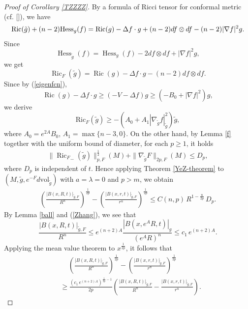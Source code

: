 \documentclass[11pt]{amsart}
\numberwithin{equation}{section}
\newcommand{\vol}{\mathrm{vol}}
\begin{document}
\begin{proof}[Proof of Corollary \ref{TZZZZ}]
	By  a formula of  Ricci tensor  for conformal metric  (cf. [\cite{Be}]), we have 
	\begin{align*}
		\mathrm{Ric}(\tilde{g})+(n-2) {\rm Hess}_g(f)=\mathrm{Ric}(g)-\Delta f\cdot g +(n-2)df\otimes df -(n-2)|\nabla f|^2 g.
	\end{align*}
	   Since
	   \[
\operatorname{Hess}_{\tilde{g}}(f)=\operatorname{Hess}_{g}(f)-2df\otimes df+|\nabla f|^2g,
\]
we get
	\begin{equation*}
	\operatorname{Ric}_F(\tilde{g})=\operatorname{Ric}(g)-\Delta f\cdot g-(n-2)df\otimes df.
	\end{equation*}
Since by (\ref{eigenfcn}), 
  $$\operatorname{Ric}(g)-\Delta f\cdot g\geq (-V-\Delta f)g\geq (-B_0+|\nabla f|^2)g, $$
	we derive
	 \begin{equation}\label{zhu}
		\mathrm{Ric}_{F}(\tilde{g})\geq -\left(A_0 + A_1|\nabla_{\tilde g}   f|_{\tilde g}^2\right)\tilde g,
	\end{equation}
	where $A_0=e^{2A}B_0$, $A_1=\max\{n-3,0\}$.  On the other hand, by Lemma \ref{f} together with the uniform bound of diameter,    for each $p\geq 1$, it holds
	\begin{align}\label{bound}
	\|{\operatorname{Ric}_{F}}_-(\tilde{g})\|^{\frac{1}{2}}_{p,F}(M)+\|\nabla_{\tilde{g}}F\|_{2p,F}(M)\leq D_p,
	\end{align}
where $D_p$ is independent of $t$.  Hence   applying Theorem \ref{YeZ-theorem} to $(M,\tilde{g},e^{-F}d\vol_{\tilde{g}})$ with $a=\lambda=0$ and $p>m$, 
  we obtain
	\begin{align}\label{p-volume}
			\left(\frac{ |B(x,R,t)|_{\tilde{g}, F}}{R^n}\right)^{\frac{1}{2p}}-\left(\frac{|B(x,r,t)|_{\tilde{g}, F}}{r^n}\right)^{\frac{1}{2p}}\leq C(n,p)\,R^{1-\frac{n}{2p}}\,D_p.
		\end{align}
By Lemma \ref{ball} and (\ref{Zhang}),  we see that
\[
\frac{|B(x,R,t)|_{\tilde{g},F}}{R^n}\leq e^{(n+2)A}\frac{|B(x,e^{A}R,t)|_g}{(e^{A}R)^n}\leq c_1\,e^{(n+2)A}.
\]
Applying the mean value theorem to $x^{\frac{1}{2p}}$, it follows that
	\begin{align*}
	&\quad\,\left(\frac{|B(x,R,t)|_{\tilde{g}, F}}{R^n}\right)^{\frac{1}{2p}}-\left(\frac{|B(x,r,t)|_{\tilde{g}, F}}{r^n}\right)^{\frac{1}{2p}}\\&\geq\frac{(c_1\,e^{(n+2)A})^{\frac{1}{2p}-1}}{2p}\left(\frac{|B(x,R,t)|_{\tilde{g}, F}}{R^n}-\frac{|B(x,r,t)|_{\tilde{g}, F}}{r^n}\right).

\end{align*}
\end{proof}
\end{document}
